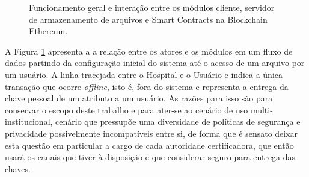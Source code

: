 \documentclass[a4paper,11pt]{article}
\begin{document}

\begin{figure}[H]
  \centering
  
  \caption{Funcionamento geral e interação entre os módulos cliente, servidor de armazenamento de arquivos e Smart Contracts na Blockchain Ethereum.}
  \label{fig:diagramaSmartDCPABE}
\end{figure}


A Figura \ref{fig:diagramaSmartDCPABE} apresenta a a relação entre os atores e os módulos em um fluxo de dados partindo da configuração inicial do sistema até o acesso de um arquivo por um usuário.
A linha tracejada entre o Hospital e o Usuário e indica a única transação que ocorre \emph{offline}, isto é, fora do sistema e representa a entrega da chave pessoal de um atributo a um usuário.
As razões para isso são para conservar o escopo deste trabalho e para ater-se ao cenário de uso multi-institucional, cenário que pressupõe uma diversidade de políticas de segurança e privacidade possivelmente incompatíveis entre si, de forma que é sensato deixar esta questão em particular a cargo de cada autoridade certificadora, que então usará os canais que tiver à disposição e que considerar seguro para entrega das chaves.
\end{document}
